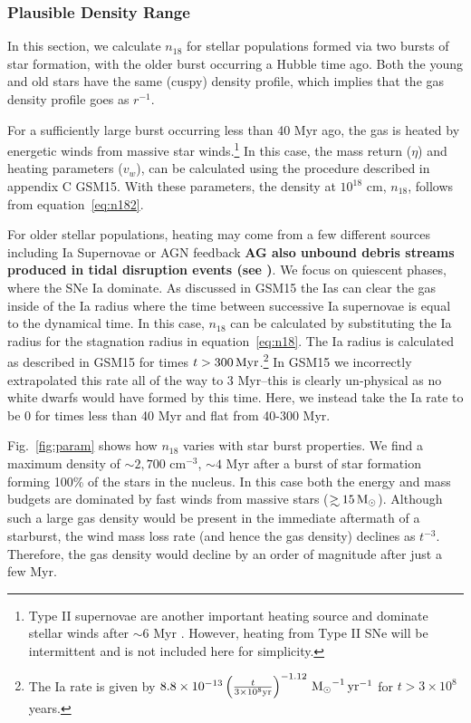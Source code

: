 \documentclass[usenatbib,fleqn]{mnras}
\newcommand\gsim{\mathrel{\rlap{\lower4pt\hbox{\hskip1pt$\sim$}}
    \raise1pt\hbox{$>$}}}
\newcommand{\Msun}{{\rm M_\odot}}
\begin{document}
\subsubsection{Plausible Density Range}
\label{sec:densAllowed}

In this section, we calculate $n_{18}$ for stellar populations
formed via two bursts of star formation, with the older burst
occurring a Hubble time ago.  Both the young and old stars have the
same (cuspy) density profile, which implies that the gas density
profile goes as $r^{-1}$.

For a sufficiently large burst occurring less than 40 Myr ago, the gas
is heated by energetic winds from massive star winds.\footnote{Type II
  supernovae are another important heating source and dominate stellar
  winds after $\sim$6 Myr \citep{Voss+2009}. However, heating from
  Type II SNe will be intermittent and is not included here for
  simplicity.}  In this case, the mass return ($\eta$) and heating
parameters ($v_w$), can be calculated using the procedure described in
appendix C GSM15. With these parameters, the density at $10^{18}$ cm,
$n_{18}$, follows from equation~\eqref{eq:n182}.

For older stellar populations, heating may come from a few different
sources including Ia Supernovae or AGN feedback {\bf AG also unbound
  debris streams produced in tidal disruption events (see
  \citep{Guillochon+2015a})}. We focus on quiescent phases, where the
SNe Ia dominate. As discussed in GSM15 the Ias can clear the gas
inside of the Ia radius where the time between successive Ia
supernovae is equal to the dynamical time. In this case, $n_{18}$ can
be calculated by substituting the Ia radius for the stagnation radius
in equation~\eqref{eq:n18}. The Ia radius is calculated as described
in GSM15 for times $t>300 \,{\rm Myr}$.\footnote{The Ia rate is given
  by $8.8 \times 10^{-13} \left(\frac{t}{3\times 10^{8} {\rm
        yr}}\right)^{-1.12} \, \Msun^{-1} \, {\rm yr}^{-1} $ for
  $t>3\times 10^8$ years.} In GSM15 we incorrectly extrapolated this
rate all of the way to 3 Myr--this is clearly un-physical as no white
dwarfs would have formed by this time. Here, we instead take the Ia
rate to be 0 for times less than 40 Myr and flat from 40-300 Myr.

Fig.~\ref{fig:param} shows how $n_{18}$ varies with star burst
properties.  We find a maximum density of $\sim 2,700$ cm$^{-3}$,
$\sim 4$ Myr after a burst of star formation forming 100\% of the
stars in the nucleus. In this case both the energy and mass budgets
are dominated by fast winds from massive stars ($\gsim 15 \, \Msun$).
Although such a large gas density would be present in the immediate
aftermath of a starburst, the wind mass loss rate (and hence the gas
density) declines as $t^{-3}$. Therefore, the gas density would
decline by an order of magnitude after just a few Myr.
\end{document}
